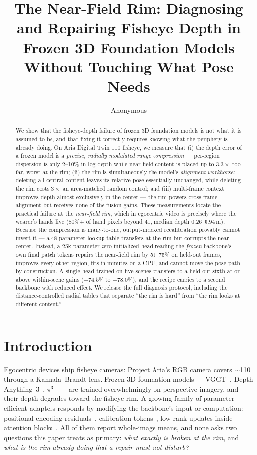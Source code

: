 \documentclass{article}
\title{The Near-Field Rim: Diagnosing and Repairing Fisheye Depth in Frozen
3D Foundation Models Without Touching What Pose Needs}
\author{%
  Anonymous\\
}
\begin{document}
\maketitle

\begin{abstract}
We show that the fisheye-depth failure of frozen 3D foundation models is not
what it is assumed to be, and that fixing it correctly requires knowing what
the periphery is already doing. On Aria Digital Twin 110\textdegree{} fisheye,
we measure that (i) the depth error of a frozen model is a \emph{precise,
radially modulated range compression} --- per-region dispersion is only
2--10\% in log-depth while near-field content is placed up to $3.3\times$ too
far, worst at the rim; (ii) the rim is simultaneously the model's
\emph{alignment workhorse}: deleting all central content leaves its relative
pose essentially unchanged, while deleting the rim costs $3\times$ an
area-matched random control; and (iii) multi-frame context improves depth
almost exclusively in the center --- the rim powers cross-frame alignment but
receives none of the fusion gains. These measurements locate the practical
failure at the \emph{near-field rim}, which in egocentric video is precisely
where the wearer's hands live (80\%+ of hand pixels beyond
41\textdegree{}, median depth 0.26--0.94\,m). Because the compression is
many-to-one, output-indexed recalibration provably cannot invert it --- a
48-parameter lookup table transfers at the rim but corrupts the near center.
Instead, a 25k-parameter zero-initialized head reading the \emph{frozen}
backbone's own final patch tokens repairs the near-field rim by 51--75\% on
held-out frames, improves every other region, fits in minutes on a CPU, and
cannot move the pose path by construction. A single head trained on five
scenes transfers to a held-out sixth at or above within-scene gains
($-74.5\%$ to $-78.0\%$), and the recipe carries to a second backbone with
reduced effect. We release the full diagnosis protocol, including the
distance-controlled radial tables that separate ``the rim is hard'' from
``the rim looks at different content.''
\end{abstract}

\section{Introduction}
\label{sec:intro}

Egocentric devices ship fisheye cameras: Project Aria's RGB camera covers
$\sim$110\textdegree{} through a Kannala--Brandt lens. Frozen 3D foundation
models --- VGGT~\cite{vggt}, Depth Anything~3~\cite{da3},
$\pi^3$~\cite{pi3} --- are trained overwhelmingly on perspective imagery, and
their depth degrades toward the fisheye rim. A growing family of
parameter-efficient adapters responds by modifying the backbone's input or
computation: positional-encoding residuals~\cite{raytun3r}, calibration
tokens~\cite{fisheye3r,caltokens}, low-rank updates inside attention
blocks~\cite{depthfisheye}. All of them report whole-image means, and none
asks two questions this paper treats as primary: \emph{what exactly is broken
at the rim}, and \emph{what is the rim already doing that a repair must not
disturb?}
\end{document}
